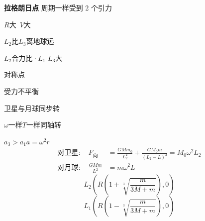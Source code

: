 \textbf{拉格朗日点}
周期一样\qquad 受到 2 个引力 %

$R$大\ $V$大

$L_2$比$L_3$离地球远

$L_2$合力比·$L_1$ $L_3$大

对称点 %

受力不平衡

卫星与月球同步转\quad {} %

$\omega$一样\quad $T$一样\quad 同轴转 %

$a_3>a_1$\qquad $a=\omega^{2}r$
\[
\begin{aligned}
\text{对卫星}:\quad F_{\text{向}}&=\frac{GMm_0}{L_2^{2}}+\frac{GM_0m}{(L_2-L)^{2}}=M_0\omega^{2}L_2\\[8pt]
\text{对月球}:\quad \frac{GMm}{L^{2}}&=m\omega^{2}L
\end{aligned}
\] %
\[ L_2\left(R\left(1+\sqrt[3]{\frac{m}{3M+m}}\right),0\right) \]
\[ L_1\left(R\left(1-\sqrt[3]{\frac{m}{3M+m}}\right),0\right) \] %
